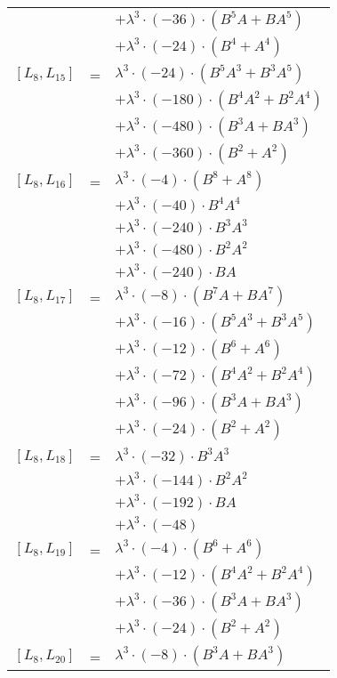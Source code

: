 \documentclass{article}
\begin{document}
\begin{center}
\begin{longtable}{lll}
 & & $ + {\lambda}^3{\cdot}(-36){\cdot}(B^{5}A+BA^{5})$ \\*
 & & $ + {\lambda}^3{\cdot}(-24){\cdot}(B^{4}+A^{4})$ \\
$[L_{8},L_{15}]$ & = & ${\lambda}^3{\cdot}(-24){\cdot}(B^{5}A^{3}+B^{3}A^{5})$ \\*
 & & $ + {\lambda}^3{\cdot}(-180){\cdot}(B^{4}A^{2}+B^{2}A^{4})$ \\*
 & & $ + {\lambda}^3{\cdot}(-480){\cdot}(B^{3}A+BA^{3})$ \\*
 & & $ + {\lambda}^3{\cdot}(-360){\cdot}(B^{2}+A^{2})$ \\
$[L_{8},L_{16}]$ & = & ${\lambda}^3{\cdot}(-4){\cdot}(B^{8}+A^{8})$ \\*
 & & $ + {\lambda}^3{\cdot}(-40){\cdot}B^{4}A^{4}$ \\*
 & & $ + {\lambda}^3{\cdot}(-240){\cdot}B^{3}A^{3}$ \\*
 & & $ + {\lambda}^3{\cdot}(-480){\cdot}B^{2}A^{2}$ \\*
 & & $ + {\lambda}^3{\cdot}(-240){\cdot}BA$ \\
$[L_{8},L_{17}]$ & = & ${\lambda}^3{\cdot}(-8){\cdot}(B^{7}A+BA^{7})$ \\*
 & & $ + {\lambda}^3{\cdot}(-16){\cdot}(B^{5}A^{3}+B^{3}A^{5})$ \\*
 & & $ + {\lambda}^3{\cdot}(-12){\cdot}(B^{6}+A^{6})$ \\*
 & & $ + {\lambda}^3{\cdot}(-72){\cdot}(B^{4}A^{2}+B^{2}A^{4})$ \\*
 & & $ + {\lambda}^3{\cdot}(-96){\cdot}(B^{3}A+BA^{3})$ \\*
 & & $ + {\lambda}^3{\cdot}(-24){\cdot}(B^{2}+A^{2})$ \\
$[L_{8},L_{18}]$ & = & ${\lambda}^3{\cdot}(-32){\cdot}B^{3}A^{3}$ \\*
 & & $ + {\lambda}^3{\cdot}(-144){\cdot}B^{2}A^{2}$ \\*
 & & $ + {\lambda}^3{\cdot}(-192){\cdot}BA$ \\*
 & & $ + {\lambda}^3{\cdot}(-48)$ \\
$[L_{8},L_{19}]$ & = & ${\lambda}^3{\cdot}(-4){\cdot}(B^{6}+A^{6})$ \\*
 & & $ + {\lambda}^3{\cdot}(-12){\cdot}(B^{4}A^{2}+B^{2}A^{4})$ \\*
 & & $ + {\lambda}^3{\cdot}(-36){\cdot}(B^{3}A+BA^{3})$ \\*
 & & $ + {\lambda}^3{\cdot}(-24){\cdot}(B^{2}+A^{2})$ \\
$[L_{8},L_{20}]$ & = & ${\lambda}^3{\cdot}(-8){\cdot}(B^{3}A+BA^{3})$ \\*

\end{longtable}
\end{center}
\end{document}
